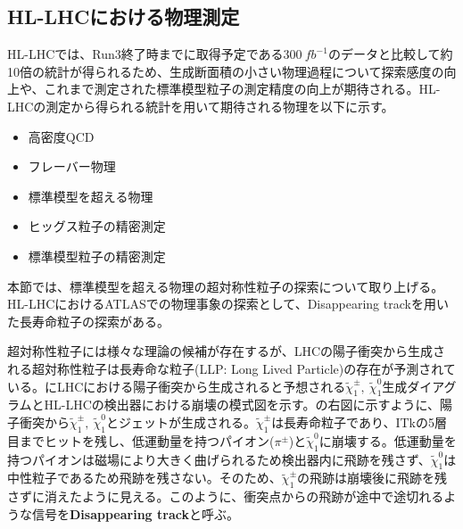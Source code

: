 \subsection{HL-LHCにおける物理測定}
\label{sec:hl-lhc-physics}
HL-LHCでは、Run3終了時までに取得予定である$300\ \si{fb^{-1}}$のデータと比較して約10倍の統計が得られるため、生成断面積の小さい物理過程について探索感度の向上や、これまで測定された標準模型粒子の測定精度の向上が期待される。HL-LHCの測定から得られる統計を用いて期待される物理を以下に示す。
\begin{itemize}
  \item 高密度QCD \cite{HLQCD}
  \item フレーバー物理 \cite{HLflavor}
  \item 標準模型を超える物理 \cite{HLBSM}
  \item ヒッグス粒子の精密測定 \cite{HLHIGGS}
  \item 標準模型粒子の精密測定 \cite{HLSM}
\end{itemize}
本節では、標準模型を超える物理の超対称性粒子の探索について取り上げる。HL-LHCにおけるATLASでの物理事象の探索として、Disappearing trackを用いた長寿命粒子の探索がある。

超対称性粒子には様々な理論の候補が存在するが、LHCの陽子衝突から生成される超対称性粒子は長寿命な粒子(LLP: Long Lived Particle)の存在が予測されている。にLHCにおける陽子衝突から生成されると予想される$\tilde{\chi}_1^{\pm},\ \tilde{\chi}_1^0$生成ダイアグラムとHL-LHCの検出器における崩壊の模式図を示す。の右図に示すように、陽子衝突から$\tilde{\chi}_1^{\pm},\ \tilde{\chi}_1^0$とジェットが生成される。$\tilde{\chi}_1^{\pm}$は長寿命粒子であり、ITkの5層目までヒットを残し、低運動量を持つパイオン($\pi^{\pm}$)と$\tilde{\chi}_1^0$に崩壊する。低運動量を持つパイオンは磁場により大きく曲げられるため検出器内に飛跡を残さず、$\tilde{\chi}_1^0$は中性粒子であるため飛跡を残さない。そのため、$\tilde{\chi}_1^{\pm}$の飛跡は崩壊後に飛跡を残さずに消えたように見える。このように、衝突点からの飛跡が途中で途切れるような信号を\textbf{Disappearing track}と呼ぶ。

